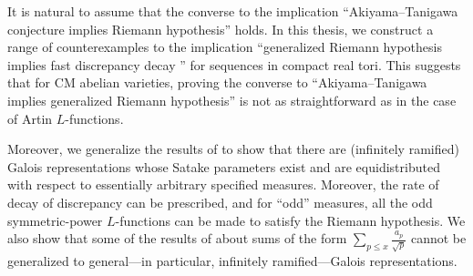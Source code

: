 It is natural to assume that the converse to the implication 
``Akiyama--Tanigawa conjecture implies Riemann hypothesis'' holds. 
In this thesis, we construct a range of counterexamples to the implication 
``generalized Riemann hypothesis implies fast discrepancy decay '' for sequences 
in compact real tori. This suggests that for CM abelian varieties, proving the 
converse to ``Akiyama--Tanigawa implies generalized Riemann hypothesis'' is not 
as straightforward as in the case of Artin $L$-functions. 

Moreover, we generalize the results of \cite{pande-2011} to show that there are 
(infinitely ramified) Galois representations whose Satake parameters exist and 
are equidistributed with respect to essentially arbitrary specified measures. 
Moreover, the rate of decay of discrepancy can be prescribed, and for ``odd'' 
measures, all the odd symmetric-power $L$-functions can be made to satisfy the 
Riemann hypothesis. We also show 
that some of the results of \cite{sarnak-2007} about sums of the form 
$\sum_{p\leqslant x} \frac{a_p}{\sqrt p}$ cannot be generalized to 
general---in particular, infinitely ramified---Galois representations. 
